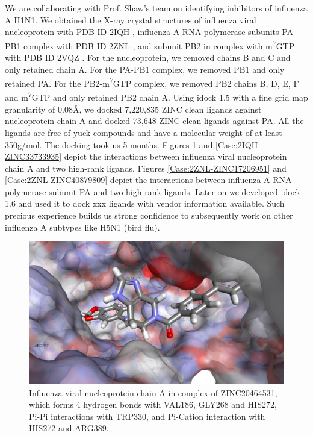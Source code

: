 We are collaborating with Prof. Shaw's team on identifying inhibitors of influenza A H1N1. We obtained the X-ray crystal structures of influenza viral nucleoprotein with PDB ID 2IQH \citep{1140}, influenza A RNA polymerase subunits PA-PB1 complex with PDB ID 2ZNL \citep{1141}, and subunit PB2 in complex with m\textsuperscript{7}GTP with PDB ID 2VQZ \citep{1192}. For the nucleoprotein, we removed chains B and C and only retained chain A. For the PA-PB1 complex, we removed PB1 and only retained PA. For the PB2-m\textsuperscript{7}GTP complex, we removed PB2 chains B, D, E, F and m\textsuperscript{7}GTP and only retained PB2 chain A. Using idock 1.5 with a fine grid map granularity of 0.08\AA, we docked 7,220,835 ZINC \citep{532} clean ligands against nucleoprotein chain A and docked 73,648 ZINC clean ligands against PA. All the ligands are free of yuck compounds and have a molecular weight of at least 350g/mol. The docking took us 5 months. Figures \ref{Case:2IQH-ZINC20464531} and \ref{Case:2IQH-ZINC33733935} depict the interactions between influenza viral nucleoprotein chain A and two high-rank ligands. Figures \ref{Case:2ZNL-ZINC17206951} and \ref{Case:2ZNL-ZINC40879809} depict the interactions between influenza A RNA polymerase subunit PA and two high-rank ligands. Later on we developed idock 1.6 and used it to dock xxx ligands with vendor information available. Such precious experience builds us strong confidence to subsequently work on other influenza A subtypes like H5N1 (bird flu).

\begin{figure}
\centering
\includegraphics[width=\linewidth]{Case/2IQH-ZINC20464531.png}
\caption{Influenza viral nucleoprotein chain A in complex of ZINC20464531, which forms 4 hydrogen bonds with VAL186, GLY268 and HIS272, Pi-Pi interactions with TRP330, and Pi-Cation interaction with HIS272 and ARG389.}
\label{Case:2IQH-ZINC20464531}
\end{figure}

